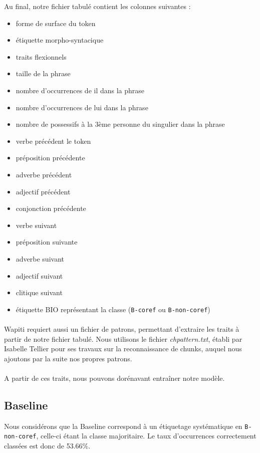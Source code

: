 \documentclass[a4paper,12pt]{article}
\begin{document}
Au final, notre fichier tabulé contient les colonnes suivantes :
\begin{itemize}
\item forme de surface du token
\item étiquette morpho-syntacique
\item traits flexionnels
\item taille de la phrase
\item nombre d'occurrences de \og il \fg{} dans la phrase
\item nombre d'occurrences de \og lui \fg{} dans la phrase
\item nombre de possessifs à la 3ème personne du singulier dans la phrase
\item verbe précédent le token
\item préposition précédente
\item adverbe précédent
\item adjectif précédent
\item  conjonction précédente
\item verbe suivant
\item préposition suivante
\item adverbe suivant
\item adjectif suivant
\item clitique suivant
\item étiquette BIO représentant la classe (\verb!B-coref! ou \verb!B-non-coref!)
\end{itemize} 

\paragraph{}
Wapiti requiert aussi un fichier de patrons, permettant d'extraire les traits à partir de notre fichier tabulé. Nous utilisons le fichier \emph{chpattern.txt}, établi par Isabelle Tellier pour ses travaux sur la reconnaissance de chunks, auquel nous ajoutons par la suite nos propres patrons.

\paragraph{}
A partir de ces traits, nous pouvons dorénavant entraîner notre modèle.


\subsection{Baseline}

Nous considérons que la Baseline correspond à un étiquetage systématique en \verb!B-non-coref!, celle-ci étant la classe majoritaire.
Le taux d'occurrences correctement classées est donc de 53.66\%.
\end{document}
